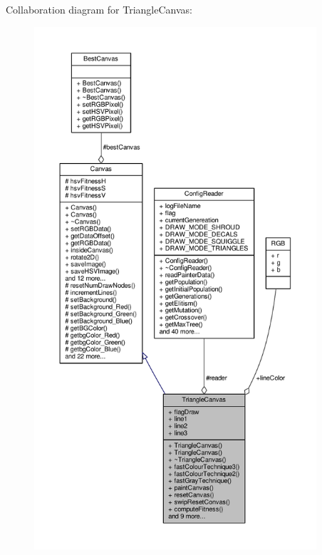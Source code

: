 Collaboration diagram for Triangle\+Canvas\+:
\nopagebreak
\begin{figure}[H]
\begin{center}
\leavevmode
\includegraphics[height=550pt]{classTriangleCanvas__coll__graph}
\end{center}
\end{figure}
